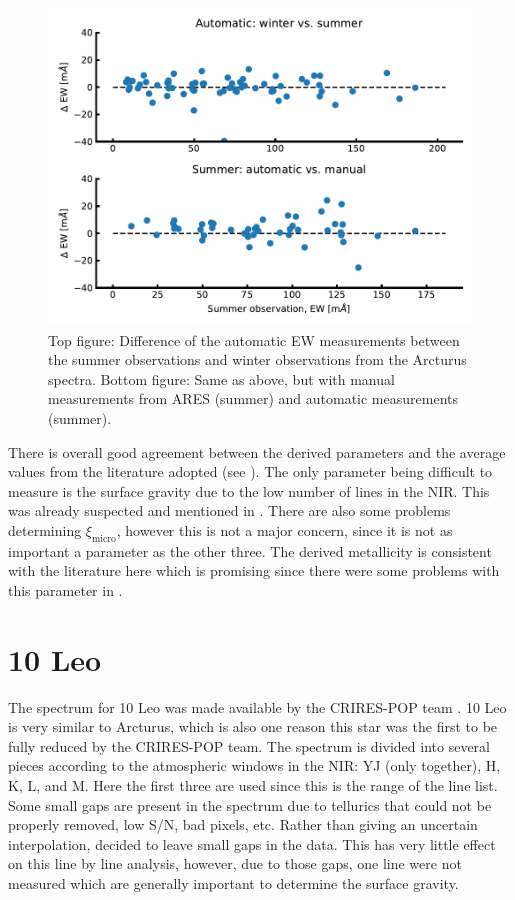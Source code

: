 \begin{figure}[htpb!]
    \centering
    \includegraphics[width=1.0\linewidth]{figures/EWcomp.pdf}
    \caption{Top figure: Difference of the automatic EW measurements between the
             summer observations and winter observations from the Arcturus
             spectra. Bottom figure: Same as above, but with manual measurements
             from ARES (summer) and automatic measurements (summer).}
    \label{fig:EWcomp}
\end{figure}

There is overall good agreement between the derived parameters and the average values from the
literature adopted (see ). The only parameter being difficult to measure is the
surface gravity due to the low number of  lines in the NIR. This was already suspected
and mentioned in . There are also some problems determining
$\xi_\mathrm{micro}$, however this is not a major concern, since it is not as important a parameter
as the other three. The derived metallicity is consistent with the literature here which is promising
since there were some problems with this parameter in .


\section{10 Leo}
\label{sec:10Leo}

The spectrum for 10 Leo was made available by the CRIRES-POP team \citep{Nicholls2017}. 10 Leo is
very similar to Arcturus, which is also one reason this star was the first to be fully reduced by
the CRIRES-POP team. The spectrum is divided into several pieces according to the atmospheric
windows in the NIR: YJ (only together), H, K, L, and M. Here the first three are used since this is
the range of the line list. Some small gaps are present in the spectrum due to tellurics that could
not be properly removed, low S/N, bad pixels, etc. Rather than giving an uncertain interpolation,
\citet{Nicholls2017} decided to leave small gaps in the data. This has very little effect on this
line by line analysis, however, due to those gaps, one  line were not measured which are
generally important to determine the surface gravity.


